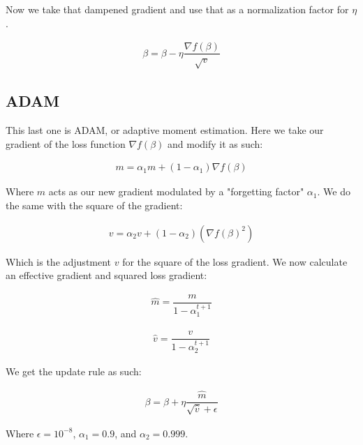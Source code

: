 \documentclass[12pt]{article}
\begin{document}
\vspace{5mm}

Now we take that dampened gradient and use that as a normalization factor for $\eta$.

\begin{align*}
\beta = \beta - \eta \dfrac{\nabla f(\beta)}{\sqrt{v}}
\end{align*}

\subsection{ADAM}

This last one is ADAM, or adaptive moment estimation. Here we take our gradient of the loss function $\nabla f(\beta)$ and modify it as such:

\begin{align*}
m = \alpha_1 m + (1-\alpha_1) \nabla f(\beta)
\end{align*}

\vspace{5mm}

Where $m$ acts as our new gradient modulated by a "forgetting factor" $\alpha_1$. We do the same with the square of the gradient:

\begin{align*}
v = \alpha_2 v + (1-\alpha_2) (\nabla f(\beta)^2)
\end{align*}

\vspace{5mm}

Which is the adjustment $v$ for the square of the loss gradient. We now calculate an effective gradient and squared loss gradient:

\begin{align*}
\hat{m}=\dfrac{m}{1-\alpha_1^{t+1}}
\end{align*}

\begin{align*}
\hat{v}=\dfrac{v}{1-\alpha_2^{t+1}}
\end{align*}

\vspace{5mm}

We get the update rule as such:

\begin{align*}
\beta = \beta + \eta \dfrac{\hat{m}}{\sqrt{\hat{v}}+\epsilon}
\end{align*}

\vspace{5mm}

Where $\epsilon=10^{-8}$, $\alpha_1=0.9$, and $\alpha_2=0.999$.
\end{document}
